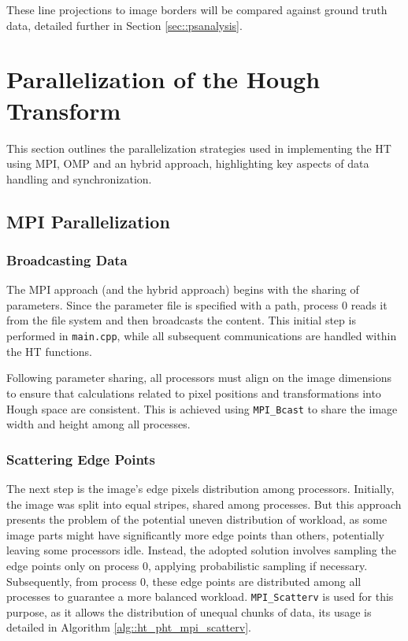 \documentclass[conference]{IEEEtran}
\begin{document}
        These line projections to image borders will be compared against ground truth data, detailed further in Section \ref{sec::psanalysis}.

\section{Parallelization of the Hough Transform}
\label{sec:parallel_ht}

    This section outlines the parallelization strategies used in implementing the HT using MPI, OMP and an hybrid approach, highlighting key aspects of data handling and synchronization.
    
    \subsection{MPI Parallelization}
    \label{subsec:mpi_parallelization}
    
        \subsubsection{Broadcasting Data}
            The MPI approach (and the hybrid approach) begins with the sharing of parameters. Since the parameter file is specified with a path, process 0 reads it from the file system and then broadcasts the content. This initial step is performed in \texttt{main.cpp}, while all subsequent communications are handled within the HT functions.
            
            Following parameter sharing, all processors must align on the image dimensions to ensure that calculations related to pixel positions and transformations into Hough space are consistent. This is achieved using \texttt{MPI\_Bcast} to share the image width and height among all processes.
        
        \subsubsection{Scattering Edge Points}
            The next step is the image's edge pixels distribution among processors. Initially, the image was split into equal stripes, shared among processes. But this approach presents the problem of the potential uneven distribution of workload, as some image parts might have significantly more edge points than others, potentially leaving some processors idle. Instead, the adopted solution involves sampling the edge points only on process 0, applying probabilistic sampling if necessary. Subsequently, from process 0, these edge points are distributed among all processes to guarantee a more balanced workload. \texttt{MPI\_Scatterv} is used for this purpose, as it allows the distribution of unequal chunks of data, its usage is detailed in Algorithm \ref{alg::ht_pht_mpi_scatterv}.
            
\end{document}
